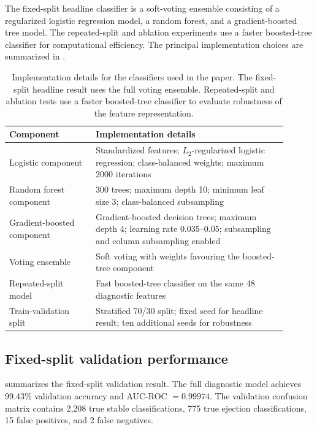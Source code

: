\documentclass[12pt,a4paper]{article}
\begin{document}
The fixed-split headline classifier is a soft-voting ensemble consisting of a regularized logistic regression model, a random forest, and a gradient-boosted tree model. The repeated-split and ablation experiments use a faster boosted-tree classifier for computational efficiency. The principal implementation choices are summarized in .

\begin{table}[H]
\centering
\caption{Implementation details for the classifiers used in the paper. The fixed-split headline result uses the full voting ensemble. Repeated-split and ablation tests use a faster boosted-tree classifier to evaluate robustness of the feature representation.}
\label{tab:model_details}
\begin{tabular}{p{0.28\linewidth}p{0.62\linewidth}}
\toprule
Component & Implementation details \\
\midrule
Logistic component & Standardized features; \(L_2\)-regularized logistic regression; class-balanced weights; maximum 2000 iterations \\
Random forest component & 300 trees; maximum depth 10; minimum leaf size 3; class-balanced subsampling \\
Gradient-boosted component & Gradient-boosted decision trees; maximum depth 4; learning rate \(0.035\)--\(0.05\); subsampling and column subsampling enabled \\
Voting ensemble & Soft voting with weights favouring the boosted-tree component \\
Repeated-split model & Fast boosted-tree classifier on the same 48 diagnostic features \\
Train-validation split & Stratified 70/30 split; fixed seed for headline result; ten additional seeds for robustness \\
\bottomrule
\end{tabular}
\end{table}

\subsection{Fixed-split validation performance}
\label{sec:fixed_split_performance}

 summarizes the fixed-split validation result. The full diagnostic model achieves 99.43\% validation accuracy and AUC-ROC \(=0.99974\). The validation confusion matrix contains 2,208 true stable classifications, 775 true ejection classifications, 15 false positives, and 2 false negatives.
\end{document}
